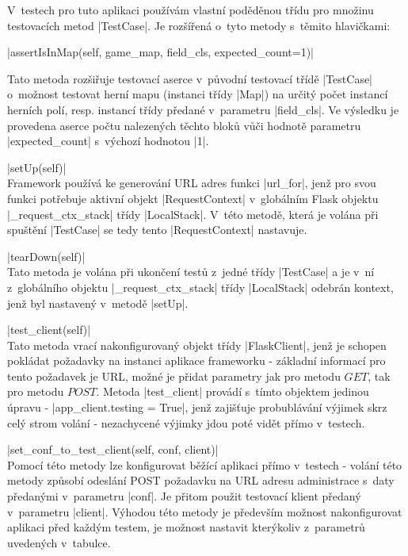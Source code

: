 V~testech pro tuto aplikaci používám vlastní poděděnou třídu pro množinu testovacích metod \ic|TestCase|. Je rozšířená o~tyto metody s~těmito hlavičkami:
\begin{description}
	\item \ic|assertIsInMap(self, game_map, field_cls, expected_count=1)|
    \begin{sloppypar}
	   Tato metoda rozšiřuje testovací aserce v~původní testovací třídě \ic|TestCase| o~možnost testovat herní mapu (instanci třídy \ic|Map|) na určitý počet instancí herních polí, resp. instancí třídy předané v~parametru \ic|field_cls|. Ve výsledku je provedena aserce počtu nalezených těchto bloků vůči hodnotě parametru \ic|expected_count| s~výchozí hodnotou \ic|1|.
    \end{sloppypar}
    
    \item \ic|setUp(self)| \\
    Framework  používá ke generování URL adres funkci \ic|url_for|, jenž pro svou funkci potřebuje aktivní objekt \ic|RequestContext| v~globálním Flask objektu \ic|_request_ctx_stack| třídy \ic|LocalStack|. V~této metodě, která je volána při spuštění \ic|TestCase| se tedy tento \ic|RequestContext| nastavuje. 

    \item \ic|tearDown(self)| \\
    Tato metoda je volána při ukončení testů z~jedné třídy \ic|TestCase| a je v~ní z~globálního objektu \ic|_request_ctx_stack| třídy \ic|LocalStack| odebrán kontext, jenž byl nastavený v~metodě \ic|setUp|.

    \item \ic|test_client(self)| \\
    Tato metoda vrací nakonfigurovaný objekt třídy \ic|FlaskClient|, jenž je schopen pokládat požadavky na instanci aplikace frameworku  - základní informací pro tento požadavek je URL, možné je přidat parametry jak pro  metodu $GET$, tak pro metodu $POST$. Metoda \ic|test_client| provádí s~tímto objektem jedinou úpravu - \ic|app_client.testing = True|, jenž zajišťuje probublávání výjimek skrz celý strom volání - nezachycené výjimky jdou poté vidět přímo v~testech.

    \item \ic|set_conf_to_test_client(self, conf, client)| \\
    Pomocí této metody lze konfigurovat běžící aplikaci přímo v~testech - volání této metody způsobí odeslání POST požadavku na URL adresu administrace s~daty předanými v~parametru \ic|conf|. Je přitom použit testovací klient předaný v~parametru \ic|client|. Výhodou této metody je především možnost nakonfigurovat aplikaci před každým testem, je možnost nastavit kterýkoliv z~parametrů uvedených v~tabulce. 
\end{description}

